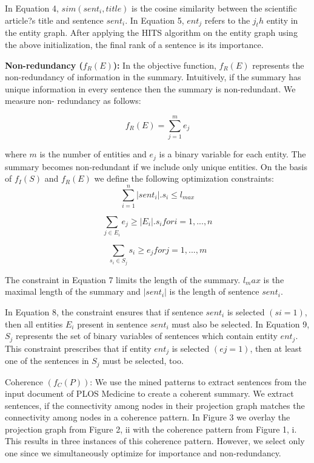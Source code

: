 In Equation 4, $sim(sent_i,title)$ is the cosine similarity between the scientific article?s title and sentence $sent_i$. 
In Equation 5, $ent_j$ refers to the $j_th$ entity in the entity graph. 
After applying the HITS algorithm on the entity graph using the above initialization, the final rank of a sentence is its importance.

\textbf{Non-redundancy ($f_R(E)$):} In the objective function, $f_R(E)$ represents the non-redundancy of information in the summary. Intuitively, if the summary has unique information in every sentence then the summary is non-redundant. 
We measure non- redundancy as follows:

\begin{equation}
f_R(E) = \sum_{j=1}^{m}{e_j}
\end{equation}

where $m$ is the number of entities and $e_j$ is a binary variable for each entity. 
The summary becomes non-redundant if we include only unique entities. 
On the basis of $f_I(S)$ and $f_R(E)$ we define the following optimization constraints:
\begin{equation}
\sum_{i=1}^{n} |sent_i|.s_i \le l_{max}
\end{equation}

\begin{equation}
\sum_{j\in E_i} {e_j  \ge |E_i|.s_i} for i = 1,...,n
\end{equation}

\begin{equation}
\sum_{s_i \in S_j}{s_i \ge e_j} for j = 1,...,m
\end{equation}

The constraint in Equation 7 limits the length of the summary. 
$l_max$ is the maximal length of the summary and $|sent_i|$ is the length of sentence $sent_i$.

In Equation 8, the constraint ensures that if sentence $sent_i$ is selected $(si = 1)$, then all entities $E_i$ present in sentence $sent_i$ must also be selected. 
In Equation 9, $S_j$ represents the set of binary variables of sentences which contain entity $ent_j$. 
This constraint prescribes that if entity $ent_j$ is selected $(ej = 1)$, then at least one of the sentences in $S_j$ must be selected, too.

Coherence $(f_C(P))$: We use the mined patterns to extract sentences from the input document of PLOS Medicine to create a coherent summary. 
We extract sentences, if the connectivity among nodes in their projection graph matches the connectivity among nodes in a coherence pattern. 
In Figure 3 we overlay the projection graph from Figure 2, ii with the coherence pattern from Figure 1, i. 
This results in three instances of this coherence pattern. 
However, we select only one since we simultaneously optimize for importance and non-redundancy. 


